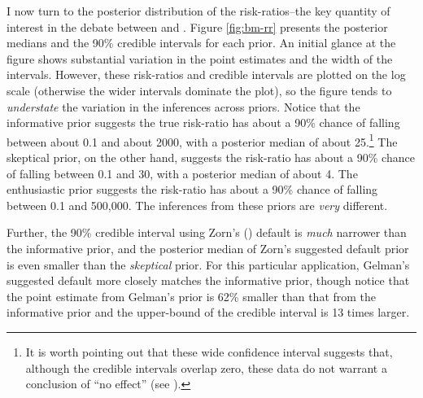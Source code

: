 \documentclass[12pt]{article}
\begin{document}
I now turn to the posterior distribution of the risk-ratios--the key quantity of interest in the debate between \cite{BellMiller2014} and \cite{Rauchhaus2009}. Figure \ref{fig:bm-rr} presents the posterior medians and the 90\% credible intervals for each prior. An initial glance at the figure shows substantial variation in the point estimates and the width of the intervals. However, these risk-ratios and credible intervals are plotted on the log scale (otherwise the wider intervals dominate the plot), so the figure tends to \textit{understate }the variation in the inferences across priors. Notice that the informative prior suggests the true risk-ratio has about a 90\% chance of falling between about 0.1 and about 2000, with a posterior median of about 25.\footnote{It is worth pointing out that these wide confidence interval suggests that, although the credible intervals overlap zero, these data do not warrant a conclusion of ``no effect'' (see \citealt{Rainey2014}).} The skeptical prior, on the other hand, suggests the risk-ratio has about a 90\% chance of falling between 0.1 and 30, with a posterior median of about 4. The enthusiastic prior suggests the risk-ratio has about a 90\% chance of falling between 0.1 and 500,000. The inferences from these priors are \emph{very} different. 

Further, the 90\% credible interval using Zorn's (\citeyear{Zorn2005}) default is \emph{much} narrower than the informative prior, and the posterior median of Zorn's suggested default prior is even smaller than the \emph{skeptical} prior. For this particular application, Gelman's suggested default more closely matches the informative prior, though notice that the point estimate from Gelman's prior is 62\% smaller than that from the informative prior and the upper-bound of the credible interval is 13 times larger.

\end{document}
